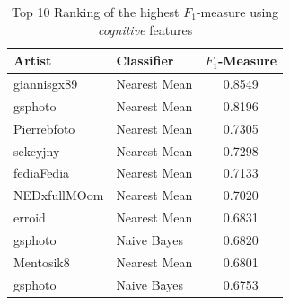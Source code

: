 
\begin{table}[htb]
    \centering
    \begin{tabular}
        { | l | l | c |} 
        \hline
        Artist & Classifier & $F_1$-Measure \\
        \hline
        giannisgx89 & Nearest Mean & 0.8549 \\ 
        gsphoto & Nearest Mean & 0.8196 \\ 
        Pierrebfoto & Nearest Mean & 0.7305 \\ 
        sekcyjny & Nearest Mean & 0.7298 \\ 
        fediaFedia & Nearest Mean & 0.7133 \\
        NEDxfullMOom & Nearest Mean & 0.7020 \\
        erroid & Nearest Mean & 0.6831 \\
        gsphoto & Naive Bayes & 0.6820 \\
        Mentosik8 & Nearest Mean & 0.6801 \\
        gsphoto & Naive Bayes & 0.6753 \\
        \hline 
    \end{tabular}
    \caption{Top 10 Ranking of the highest $F_1$-measure using \textit{cognitive} features}
    \label{ex1bresults}
\end{table}

